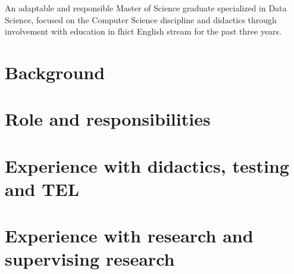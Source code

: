 An  adaptable  and  responsible  Master of Science graduate specialized in Data Science, focused on the Computer Science discipline  and  didactics through involvement  with  education  in \acrshort{fhict} English stream for the past three years.

\section{Background}\label{chapter:background}


\section{Role and responsibilities}\label{chapter:role}


\section{Experience with didactics, testing and TEL }\label{chapter:experience_didactics}


\section{Experience with research and supervising research }\label{chapter:experience_research}
